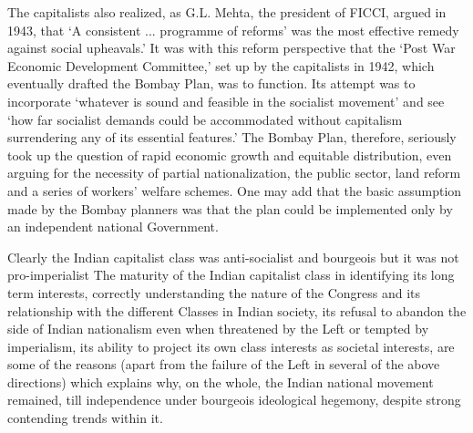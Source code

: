 The capitalists also realized, as G.L. Mehta, the president of FICCI, argued in 1943, that `A consistent ... programme of reforms' was the most effective remedy against social upheavals.' It was with this reform perspective that the `Post War Economic Development Committee,' set up by the capitalists in 1942, which eventually drafted the Bombay Plan, was to function. Its attempt was to incorporate `whatever is sound and feasible in the socialist movement' and see `how far socialist demands could be accommodated without capitalism surrendering any of its essential features.' The Bombay Plan, therefore, seriously took up the question of rapid economic growth and equitable distribution, even arguing for the necessity of partial nationalization, the public sector, land reform and a series of workers' welfare schemes. One may add that the basic assumption made by the Bombay planners was that the plan could be implemented only by an independent national Government. 

Clearly the Indian capitalist class was anti-socialist and bourgeois but it was not pro-imperialist The maturity of the Indian capitalist class in identifying its long term interests, correctly understanding the nature of the Congress and its relationship with the different Classes in Indian society, its refusal to abandon the side of Indian nationalism even when threatened by the Left or tempted by imperialism, its ability to project its own class interests as societal interests, are some of the reasons (apart from the failure of the Left in several of the above directions) which explains why, on the whole, the Indian national movement remained, till independence under bourgeois ideological hegemony, despite strong contending trends within it.
